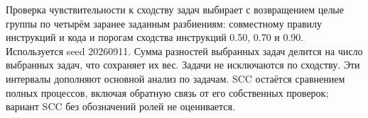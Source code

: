 Проверка чувствительности к сходству задач выбирает с возвращением целые группы по четырём заранее заданным разбиениям: совместному правилу инструкций и кода и порогам сходства инструкций 0.50, 0.70 и 0.90. Используется seed 20260911. Сумма разностей выбранных задач делится на число выбранных задач, что сохраняет их вес. Задачи не исключаются по сходству. Эти интервалы дополняют основной анализ по задачам. SCC остаётся сравнением полных процессов, включая обратную связь от его собственных проверок; вариант SCC без обозначений ролей не оценивается.
